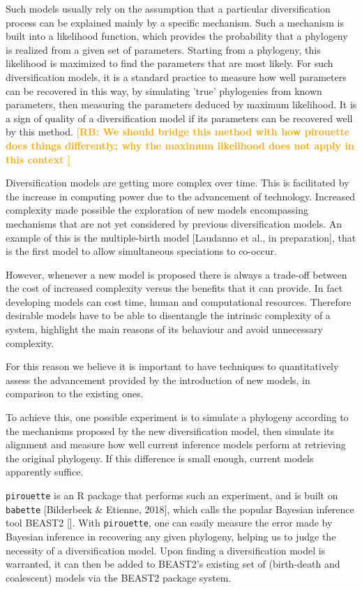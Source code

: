 \documentclass{article}
\newcommand{\richel}[1]{\textcolor{orange}{\textbf{[RB: #1]}}}
\begin{document}
Such models usually rely on the assumption 
that a particular diversification process 
can be explained mainly by a specific mechanism.
Such a mechanism is built into a likelihood function, 
which provides the probability that a phylogeny is realized 
from a given set of parameters.
Starting from a phylogeny, this likelihood is maximized
to find the parameters that are most likely.
For such diversification models, it is a standard practice 
to measure how well parameters can be recovered in this way,
by simulating 'true' phylogenies from known parameters, then
measuring the parameters deduced by maximum likelihood. 
It is a sign of quality of a diversification model 
if its parameters can be recovered well by this method.
\richel{
  We should bridge this method with how pirouette does things differently;
  why the maximum likelihood does not apply in this context  
}

Diversification models are getting more complex over time. 
This is facilitated by the increase in computing power due to the advancement of technology.
Increased complexity made possible the exploration of new models 
encompassing mechanisms that are not yet considered by previous diversification models. 
An example of this is the multiple-birth model [Laudanno et al., in preparation],
that is the first model to allow simultaneous speciations to co-occur.

However, whenever a new model is proposed there is always a trade-off 
between the cost of increased complexity versus the benefits that it can provide.
In fact developing models can cost time, human and computational resources.
Therefore desirable models have to be able to disentangle 
the intrinsic complexity of a system, 
highlight the main reasons of its behaviour and avoid unnecessary complexity. 

For this reason we believe it is important to have techniques 
to quantitatively assess the advancement provided by the introduction of new models, 
in comparison to the existing ones.

To achieve this, one possible experiment is to simulate a phylogeny 
according to the mechanisms proposed by the new diversification model, 
then simulate its alignment and measure how well current inference models perform 
at retrieving the original phylogeny.
If this difference is small enough, current models apparently
suffice.

\verb;pirouette; is an R package that performs such an experiment,
and is built on \verb;babette; [Bilderbeek \& Etienne, 2018], 
which calls the popular Bayesian inference tool 
BEAST2 [\cite{bouckaert2014beast}]. 
With \verb;pirouette;, one
can easily measure the error made by Bayesian inference in recovering
any given phylogeny, helping us to judge the necessity of a diversification 
model.
Upon finding a diversification model is warranted, 
it can then be added to BEAST2's existing set of (birth-death and 
coalescent) models via the BEAST2 package system.
\end{document}

